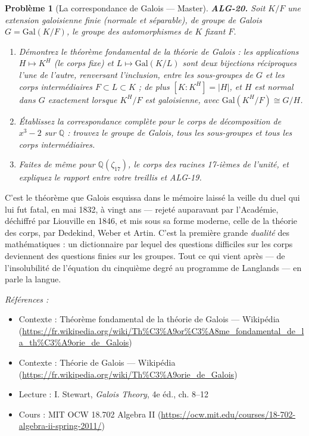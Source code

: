 \documentclass[11pt]{article}
\newtheorem{problem}{Problème}
\newenvironment{refs}{\par\small\noindent\emph{Références :}\begin{itemize}\setlength\itemsep{0pt}}{\end{itemize}\normalsize}
\begin{document}
\bigskip

\begin{problem}[{La correspondance de Galois --- Master}]
\textbf{ALG-20.} Soit $K/F$ une extension galoisienne finie (normale et
séparable), de groupe de Galois $G = \mathrm{Gal}(K/F)$, le groupe des automorphismes de $K$
fixant $F$.
\begin{enumerate}
\item[(i)] Démontrez le théorème fondamental de la théorie de Galois : les applications $H \mapsto K^H$
(le corps fixe) et $L \mapsto \mathrm{Gal}(K/L)$ sont deux bijections réciproques l'une de l'autre,
renversant l'inclusion, entre les sous-groupes de $G$ et les corps intermédiaires $F \subset L \subset K$ ;
de plus $[K : K^H] = |H|$, et $H$ est normal dans $G$ exactement lorsque $K^H/F$ est galoisienne,
avec $\mathrm{Gal}(K^H/F) \cong G/H$.
\item[(ii)] Établissez la correspondance complète pour le
corps de décomposition de $x^3 - 2$ sur $\mathbb{Q}$ : trouvez le groupe de Galois, tous les sous-groupes
et tous les corps intermédiaires.
\item[(iii)] Faites de même pour $\mathbb{Q}(\zeta_{17})$, le corps des racines
17-ièmes de l'unité, et expliquez le rapport entre votre treillis et ALG-19.
\end{enumerate}

\end{problem}

\noindent C'est le théorème que Galois esquissa dans le mémoire laissé la veille du duel qui lui fut
fatal, en mai 1832, à vingt ans --- rejeté auparavant par l'Académie, déchiffré par Liouville en 1846, et mis
sous sa forme moderne, celle de la théorie des corps, par Dedekind, Weber et Artin. C'est la première grande
\textit{dualité} des mathématiques : un dictionnaire par lequel des questions difficiles sur les corps
deviennent des questions finies sur les groupes. Tout ce qui vient après --- de l'insolubilité de l'équation du
cinquième degré au programme de Langlands --- en parle la langue.

\begin{refs}
\item Contexte : Théorème fondamental de la théorie de Galois --- Wikipédia (\url{https://fr.wikipedia.org/wiki/Th%C3%A9or%C3%A8me_fondamental_de_la_th%C3%A9orie_de_Galois})
\item Contexte : Théorie de Galois --- Wikipédia (\url{https://fr.wikipedia.org/wiki/Th%C3%A9orie_de_Galois})
\item Lecture : I. Stewart, \textit{Galois Theory}, 4e éd., ch. 8--12
\item Cours : MIT OCW 18.702 Algebra II (\url{https://ocw.mit.edu/courses/18-702-algebra-ii-spring-2011/})
\end{refs}
\end{document}
